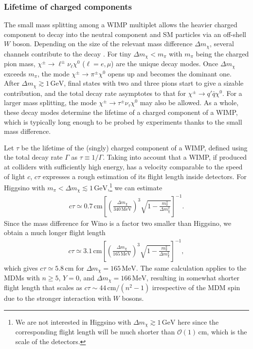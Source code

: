 \documentclass[12pt,twoside,book]{article}
\begin{document}
\subsubsection*{Lifetime of charged components}

The small mass splitting among a WIMP multiplet allows the heavier charged component to decay into the neutral component and SM particles via an off-shell $W$ boson.
Depending on the size of the relevant mass difference $\Delta m_\chi$, several channels contribute to the decay \cite{Chen:1995yu}.
For tiny $\Delta m_\chi < m_\pi$ with $m_\pi$ being the charged pion mass, $\chi^{\pm} \to \ell^{\pm} \nu_\ell \chi^0$ ($\ell = e, \mu$) are the unique decay modes.
Once $\Delta m_\chi$ exceeds $m_\pi$, the mode $\chi^{\pm} \to \pi^{\pm} \chi^0$ opens up and becomes the dominant one.
After $\Delta m_\chi \gtrsim 1\, \mathrm{GeV}$, final states with two and three pions start to give a sizable contribution, and the total decay rate asymptotes to that for $\chi^{\pm} \to q' \bar{q} \chi^0$.
For a larger mass splitting, the mode $\chi^{\pm} \to \tau^{\pm} \nu_\tau \chi^0$ may also be allowed.
As a whole, these decay modes determine the lifetime of a charged component of a WIMP, which is typically long enough to be probed by experiments thanks to the small mass difference.

Let $\tau$ be the lifetime of the (singly) charged component of a WIMP, defined using the total decay rate $\Gamma$ as $\tau \equiv 1/\Gamma$.
Taking into account that a WIMP, if produced at colliders with sufficiently high energy, has a velocity comparable to the speed of light $c$, $c \tau$ expresses a rough estimation of its flight length inside detectors.
For Higgsino with $m_\pi < \Delta m_\chi \lesssim 1\,\mathrm{GeV}$,\footnote
{
  We are not interested in Higgsino with $\Delta m_\chi \gtrsim 1\, \mathrm{GeV}$ here since the corresponding flight length will be much shorter than $\mathcal{O} (1)\, \mathrm{cm}$, which is the scale of the detectors.
}
we can estimate \cite{Chen:1995yu,Thomas:1998wy}
\begin{align}
  c \tau \simeq 0.7\, \mathrm{cm}
  \left[ \left( \frac{\Delta m_\chi}{340\,\mathrm{MeV}} \right)^3
  \sqrt{1 - \frac{m_\pi^2}{\Delta m_\chi^2}} \right]^{-1}.
\end{align}
Since the mass difference for Wino is a factor two smaller than Higgsino, we obtain a much longer flight length
\begin{align}
  c \tau \simeq 3.1\, \mathrm{cm} \left[
  \left( \frac{\Delta m_\chi}{165\, \mathrm{MeV}} \right)^3
  \sqrt{1 - \frac{m_\pi^2}{\Delta m_\chi^2}} \right]^{-1},
\end{align}
which gives $c\tau \simeq 5.8\,\mathrm{cm}$ for $\Delta m_\chi = 165\,\mathrm{MeV}$.
The same calculation applies to the MDMs with $n \geq 5$, $Y=0$, and $\Delta m_\chi = 166\, \mathrm{MeV}$, resulting in somewhat shorter flight length that scales as $c \tau \sim 44\, \mathrm{cm} / (n^2 - 1)$ irrespective of the MDM spin \cite{Cirelli:2005uq} due to the stronger interaction with $W$ bosons.
\end{document}
